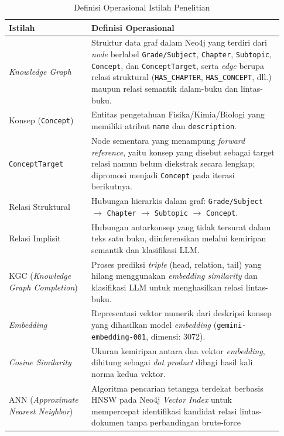 \documentclass[../../thesis]{subfiles}
\begin{document}
\begin{table}[htbp]
\centering
\caption{Definisi Operasional Istilah Penelitian}
\label{tab:definisi}
\begin{tabular}{@{}p{0.28\linewidth}p{0.65\linewidth}@{}}
  \toprule
  \textbf{Istilah} & \textbf{Definisi Operasional} \\
  \midrule
  \textit{Knowledge Graph}
    & Struktur data graf dalam Neo4j yang terdiri dari \textit{node} berlabel
      \texttt{Grade/Subject}, \texttt{Chapter}, \texttt{Subtopic},
      \texttt{Concept}, dan \texttt{ConceptTarget}, serta \textit{edge}
      berupa relasi struktural (\texttt{HAS\_CHAPTER},
      \texttt{HAS\_CONCEPT}, dll.) maupun relasi semantik
      dalam-buku dan lintas-buku. \\
  Konsep (\texttt{Concept})
    & Entitas pengetahuan Fisika/Kimia/Biologi yang memiliki atribut
      \texttt{name} dan \texttt{description}. \\
  \texttt{ConceptTarget}
    & Node sementara yang menampung \textit{forward reference}, yaitu konsep
      yang disebut sebagai target relasi namun belum diekstrak secara
      lengkap; dipromosi menjadi \texttt{Concept} pada iterasi
      berikutnya. \\
  Relasi Struktural
    & Hubungan hierarkis dalam graf: \texttt{Grade/Subject} $\to$
      \texttt{Chapter} $\to$ \texttt{Subtopic} $\to$
      \texttt{Concept}. \\
  Relasi Implisit
    & Hubungan antarkonsep yang tidak tersurat dalam teks satu buku,
      diinferensikan melalui kemiripan semantik dan klasifikasi LLM. \\
  KGC (\textit{Knowledge Graph Completion})
    & Proses prediksi \textit{triple} (head, relation, tail) yang
      hilang menggunakan \textit{embedding similarity} dan klasifikasi
      LLM untuk menghasilkan relasi lintas-buku. \\
  \textit{Embedding}
    & Representasi vektor numerik dari deskripsi konsep yang dihasilkan
      model \textit{embedding} (\texttt{gemini-embedding-001}, dimensi:
      3072). \\
  \textit{Cosine Similarity}
    & Ukuran kemiripan antara dua vektor \textit{embedding}, dihitung
      sebagai \textit{dot product} dibagi hasil kali norma kedua vektor.\\
  ANN (\textit{Approximate Nearest Neighbor})
    & Algoritma pencarian tetangga terdekat berbasis HNSW pada Neo4j
      \textit{Vector Index} untuk mempercepat identifikasi kandidat
      relasi lintas-dokumen tanpa perbandingan brute-force

\end{tabular}
\end{table}
\end{document}
